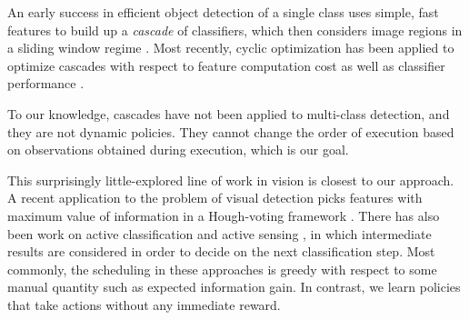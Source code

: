 An early success in efficient object detection of a single class uses simple, fast features to build up a \emph{cascade} of classifiers, which then considers image regions in a sliding window regime \cite{Viola2001}.
Most recently, cyclic optimization has been applied to optimize cascades with respect to feature computation cost as well as classifier performance \cite{Chen2012}.

To our knowledge, cascades have not been applied to multi-class detection, and they are not dynamic policies.
They cannot change the order of execution based on observations obtained during execution, which is our goal.

This surprisingly little-explored line of work in vision is closest to our approach.
A recent application to the problem of visual detection picks features with maximum value of information in a Hough-voting framework \cite{Vijayanarasimhan2010}. 
There has also been work on active classification \cite{Gao2011} and active sensing \cite{Yu2009}, in which intermediate results are considered in order to decide on the next classification step.
Most commonly, the scheduling in these approaches is greedy with respect to some manual quantity such as expected information gain.
In contrast, we learn policies that take actions without any immediate reward.
